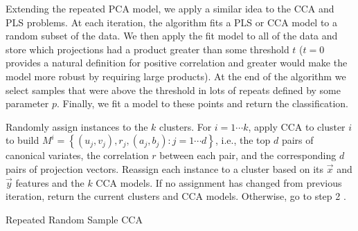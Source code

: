 Extending the repeated PCA model, we apply a similar idea to the CCA and PLS problems. At each iteration, the algorithm fits a PLS or CCA model to a random subset of the data. We then apply the fit model to all of the data and store which projections had a product greater than some threshold $t$ ($t=0$ provides a natural definition for positive correlation and greater would make the model more robust by requiring large products). At the end of the algorithm we select samples that were above the threshold in lots of repeats defined by some parameter $p$. Finally, we fit a model to these points and return the classification.

\vspace{\baselineskip}
\begin{algorithm}
\begin{algorithmic}[1]
    \STATE Randomly assign instances to the $k$ clusters.
    \STATE For $i=1 \cdots k$, apply CCA to cluster $i$ to build $M^{i}=\left\{\left(u_{j}, v_{j}\right), r_{j},\left(a_{j}, b_{j}\right): j=1 \cdots d\right\}$, i.e., the top $d$ pairs of canonical variates, the correlation $r$ between each pair, and the corresponding $d$ pairs of projection vectors.
    \STATE Reassign each instance to a cluster based on its $\vec{x}$ and $\vec{y}$ features and the $k$ CCA models.
    \STATE If no assignment has changed from previous iteration, return the current clusters and CCA models. Otherwise, go to step 2 .
\ENDWHILE
\caption[Repeated Random Sample CCA]{Repeated Random Sample CCA}
\label{alg:Repeated Random Sample CCA}
\end{algorithmic}
\end{algorithm}